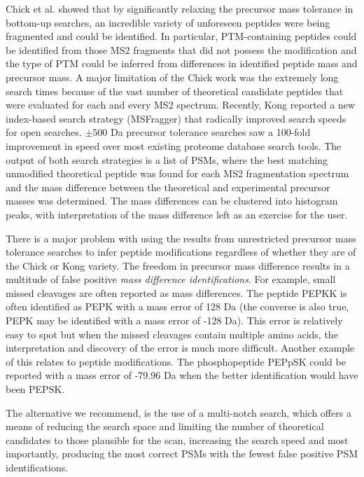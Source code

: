 \documentclass[journal=jprobs,manuscript=article]{achemso}
\begin{document}
Chick et al. showed that by significantly relaxing the precursor mass tolerance in bottom-up searches, an incredible variety of unforeseen peptides were being fragmented and could be identified\citep{Chick_2015}.
In particular, PTM-containing peptides could be identified from those MS2 fragments that did not possess the modification and the type of PTM could be inferred from differences in identified peptide mass and precursor mass.
A major limitation of the Chick work was the extremely long search times because of the vast number of theoretical candidate peptides that were evaluated for each and every MS2 spectrum.
Recently, Kong\citep{Kong_2017} reported a new index-based search strategy (MSFragger) that radically improved search speeds for open searches.
$\pm 500$ Da precursor tolerance searches saw a 100-fold improvement in speed over most existing proteome database search tools.
The output of both search strategies is a list of PSMs, where the best matching unmodified theoretical peptide was found for each MS2 fragmentation spectrum and the mass difference between the theoretical and experimental precursor masses was determined.
The mass differences can be clustered into histogram peaks\citep{Rodriguez_2014}, with interpretation of the mass difference left as an exercise for the user.

There is a major problem with using the results from unrestricted precursor mass tolerance searches to infer peptide modifications regardless of whether they are of the Chick or Kong variety.
The freedom in precursor mass difference results in a multitude of false positive \textit{mass difference identifications}.
For example, small missed cleavages are often reported as mass differences.
The peptide PEPKK is often identified as PEPK with a mass error of 128 Da (the converse is also true, PEPK may be identified with a mass error of -128 Da).
This error is relatively easy to spot but when the missed cleavages contain multiple amino acids, the interpretation and discovery of the error is much more difficult.
Another example of this relates to peptide modifications.
The phosphopeptide PEPpSK could be reported with a mass error of -79.96 Da when the better identification would have been PEPSK.

The alternative we recommend, is the use of a multi-notch search, which offers a means of reducing the search space and limiting the number of theoretical candidates to those plausible for the scan, increasing the search speed and most importantly, producing the most correct PSMs with the fewest false positive PSM identifications.
\end{document}
